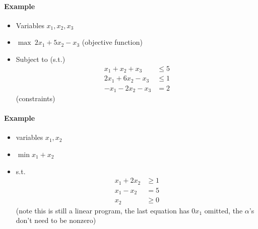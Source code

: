 \documentclass[12 pt]{article}
\begin{document}
        \paragraph{Example}
        \begin{itemize}
        \item Variables $x_1, x_2, x_3$
        \item $\max \ 2x_1 +5x_2 - x_3$ (objective function)
        \item Subject to (s.t.)
          \begin{align*}
            x_1 + x_2 + x_3 &\leq 5
            \\ 2x_1 + 6x_2 - x_3 &\leq 1
            \\ -x_1 - 2x_2 - x_3 & = 2
          \end{align*}
          (constraints)
        \end{itemize}
        \paragraph{Example}
        \begin{itemize}
        \item variables $x_1,x_2$
        \item $\min x_1 + x_2$
        \item s.t.
          \begin{align*}
            x_1 + 2x_2 & \geq 1
            \\ x_1 - x_2 & = 5
            \\ x_2 & \geq 0
          \end{align*}
          (note this is still a linear program, the last equation has
          $0x_1$ omitted, the $\alpha$'s don't need to be nonzero)
        \end{itemize}
\end{document}

